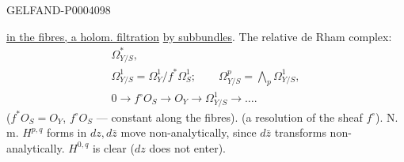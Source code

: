 \begin{GelfandAdjacentEvidence}{GELFAND-P000409}{8}


\underline{in the fibres, a holom. filtration} \underline{by subbundles}.
The relative de Rham complex:
\begingroup\color{black}\begin{gather*}
\Omega^*_{Y/S},\\
\Omega^1_{Y/S}=\Omega^1_Y/f^*\Omega^1_S;\qquad\Omega^p_{Y/S}=\bigwedge_p\Omega^1_{Y/S},\\
0\longrightarrow f^\circ O_S\longrightarrow O_Y\longrightarrow\Omega^1_{Y/S}\longrightarrow\dots.
\end{gather*}\endgroup
($f^*O_S=O_Y$, $f^\circ O_S$ — constant along the fibres).
(a resolution of the sheaf $f^\circ$).
N. m. $H^{p, q}$ forms in $dz, d\bar z$ move non-analytically, since $d\bar z$ transforms non-analytically.
$H^{0, q}$ is clear ($dz$ does not enter).
\end{GelfandAdjacentEvidence}



